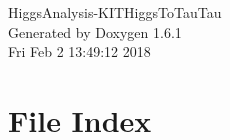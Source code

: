 \documentclass[a4paper]{book}
\begin{document}
\hypersetup{pageanchor=false}
\begin{titlepage}
\vspace*{7cm}
\begin{center}
{\Large HiggsAnalysis-\/KITHiggsToTauTau }\\
\vspace*{1cm}
{\large Generated by Doxygen 1.6.1}\\
\vspace*{0.5cm}
{\small Fri Feb 2 13:49:12 2018}\\
\end{center}
\end{titlepage}
\clearemptydoublepage
{}
\tableofcontents
\clearemptydoublepage
{}
\hypersetup{pageanchor=true}
\chapter{File Index}

\end{document}
